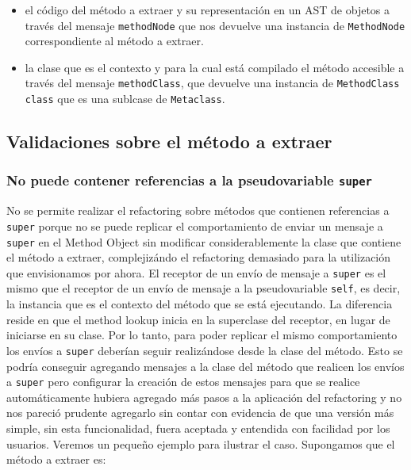 \begin{itemize}
    \item el código del método a extraer y su representación en un AST de objetos a través del mensaje
    \lstinline{methodNode} que nos devuelve una instancia de \lstinline{MethodNode} correspondiente
    al método a extraer.
    \item la clase que es el contexto y para la cual está compilado el método accesible a través
    del mensaje \lstinline{methodClass}, que devuelve una instancia de \lstinline{MethodClass class}
    que es una sublcase de \lstinline{Metaclass}.
\end{itemize}

\subsection*{Validaciones sobre el método a extraer}

\subsubsection*{No puede contener referencias a la pseudovariable \lstinline{super}}

No se permite realizar el refactoring sobre métodos que contienen referencias a \lstinline{super}
porque no se puede replicar el comportamiento de enviar un mensaje a \lstinline{super} en el Method
Object sin modificar considerablemente la clase que contiene el método a extraer, complejizándo el
refactoring demasiado para la utilización que envisionamos por ahora. El receptor de un envío de
mensaje a \lstinline{super} es el mismo que el receptor de un envío de mensaje a la pseudovariable
\lstinline{self}, es decir, la instancia que es el contexto del método que se está ejecutando. La
diferencia reside en que el method lookup inicia en la superclase del receptor, en lugar de
iniciarse en su clase. Por lo tanto, para poder replicar el mismo comportamiento los envíos a
\lstinline{super} deberían seguir realizándose desde la clase del método. Esto se podría conseguir
agregando mensajes a la clase del método que realicen los envíos a \lstinline{super} pero configurar
la creación de estos mensajes para que se realice automáticamente hubiera agregado más pasos a la aplicación
del refactoring y no nos pareció prudente agregarlo sin contar con evidencia de que una versión más simple,
sin esta funcionalidad, fuera aceptada y entendida con facilidad por los usuarios. Veremos un pequeño ejemplo
para ilustrar el caso. Supongamos que el método a extraer es:

